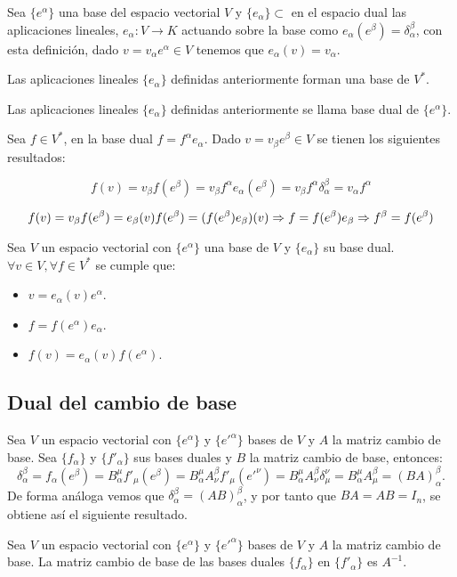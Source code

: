 Sea $\{e^\alpha\}$ una base del espacio vectorial $V$
y $\{e_\alpha\}\subset$ en el espacio dual las aplicaciones
lineales,
$e_\alpha: V
\longrightarrow
K$
actuando
sobre la
base
como $e_\alpha(e^\beta)=\delta_\alpha^\beta$, con esta definición, dado $v=v_\alpha e^\alpha\in V$ tenemos
que $e_\alpha(v)=v_\alpha$.

\begin{exercise}
  Las aplicaciones lineales $\{e_\alpha\}$ definidas anteriormente forman una base de $V^*$.
\end{exercise}

\begin{definition}
  Las aplicaciones lineales $\{e_\alpha\}$ definidas anteriormente se llama base dual de $\{e^\alpha\}$.
\end{definition}

Sea $f\in V^*$, en la base dual $f=f^\alpha e_\alpha$.
Dado $v=v_\beta e^\beta\in V$ se tienen los siguientes resultados:

\begin{equation*}
  f(v)=v_\beta f(e^\beta)=v_\beta f^\alpha e_\alpha(e^\beta)=
  v_\beta f^\alpha \delta_\alpha^\beta=v_\alpha f^\alpha
\end{equation*}

\begin{equation*}
  f(v)=v_\beta f(e^\beta)=e_\beta(v)f(e^\beta)=(f(e^\beta) e_\beta)(v)\Rightarrow f=f(e^\beta) e_\beta\Rightarrow f^\beta=f(e^\beta)
\end{equation*}

\begin{proposition}
  \label{res:coordenadas_duales}
  Sea $V$ un espacio vectorial con $\{e^\alpha\}$ una base de $V$ y $\{e_\alpha\}$ su base dual.
  $\forall v\in V, \forall f\in V^*$ se cumple que:
  \begin{itemize}
    \item $v=e_\alpha(v)e^\alpha$.
    \item $f=f(e^\alpha)e_\alpha$.
    \item $f(v)=e_\alpha(v)f(e^\alpha)$.
  \end{itemize}
\end{proposition}


\subsection{Dual del cambio de base}\label{subsec:dual-del-cambio-de-base}
Sea $V$ un espacio vectorial con $\{e^\alpha\}$ y $\{e'^\alpha\}$ bases de $V$ y $A$ la matriz cambio de base.
Sea $\{f_\alpha\}$ y $\{f'_\alpha\}$ sus bases duales y $B$ la matriz cambio de base, entonces:
\[
  \delta_\alpha^\beta=f_\alpha(e^\beta)=B_\alpha^\mu f'_\mu(e^\beta)=B_\alpha^\mu A^\beta_\nu f'_\mu(e'^\nu)=B_\alpha^\mu A^\beta_\nu\delta^\nu_\mu=B_\alpha^\mu A^\beta_\mu=(BA)^\beta_\alpha.
\]
De forma análoga vemos que $\delta^\beta_\alpha=(AB)^\beta_\alpha$, y por tanto que $BA=AB=I_n$, se obtiene así el
siguiente resultado.

\begin{proposition}
  \label{res:dual_cambio_base}
  Sea $V$ un espacio vectorial con $\{e^\alpha\}$ y $\{e'^\alpha\}$ bases de $V$ y $A$ la matriz cambio de base.
  La matriz cambio de base de las bases duales $\{f_\alpha\}$ en $\{f'_\alpha\}$ es $A^{-1}$.

\end{proposition}
